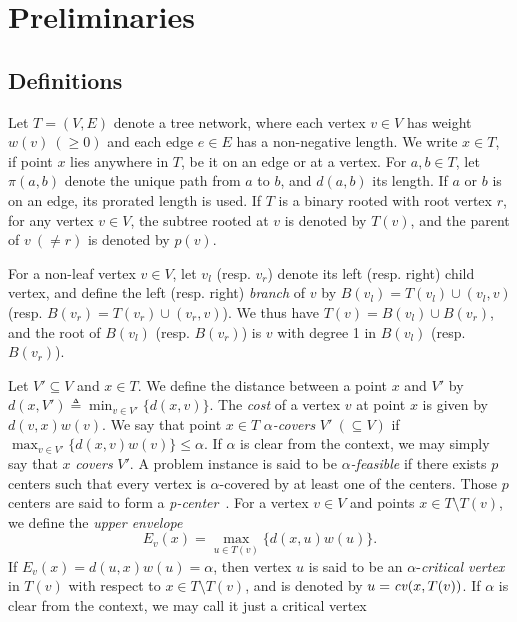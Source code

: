 \documentclass{llncs}
\begin{document}
{\section{Preliminaries}\label{sec:preliminary}

\subsection{Definitions}\label{sec:def}
Let $T\!=\!(V,E)$ denote a tree network,
where each vertex $v\in V$ has weight $w(v)~(\geq 0)$
and each edge $e\in E$ has a non-negative length.
We write $x\in T$, if point $x$ lies anywhere in $T$, be it on an edge or at a vertex.
For $a,b\in T$, 
let $\pi(a, b)$ denote the unique path from $a$ to $b$,
and $d(a, b)$ its length.
If $a$ or $b$ is on an edge,
its prorated length is used.
If $T$ is a binary rooted with root vertex $r$,
for any vertex $v\in V$, 
the subtree rooted at $v$ is denoted by $T(v)$,
and the parent of $v~(\not=r)$ is denoted by $p(v)$.

For a non-leaf vertex $v\in V$,
let $v_l$ (resp. $v_r$) denote its left (resp. right) child vertex,
and define the left (resp. right) {\em branch} of $v$ by
$B(v_l)=T(v_l) \cup (v_l,v)$ (resp. $B(v_r)=T(v_r) \cup (v_r,v)$).
We thus have $T(v) = B(v_l) \cup B(v_r)$,
and the root of $B(v_l)$ (resp. $B(v_r)$) is $v$ with degree 1
in $B(v_l)$ (resp. $B(v_r)$).

Let $V' \subseteq V$ and $x\in T$.
We define the distance between a point $x$ and $V'$ by
$
d(x,V') \triangleq \min_{v\in V'}\{d(x,v)\}.
$
The {\em cost} of a vertex $v$ at point $x$ is given by $d(v,x)w(v)$.
We say that point $x\in T$ {\em $\alpha$-covers} $V'~(\subseteq V)$
if $\max_{v\in V'}\{d(x,v)w(v)\} \leq \alpha$.
If $\alpha$ is clear from the context, we may simply say that $x$ {\em covers} $V'$.
A problem instance is said to be {\em $\alpha$-feasible} if there exists $p$ centers
such that every vertex is $\alpha$-covered by at least one of the centers.
Those $p$ centers are said to form a {\em p-center}~\cite{kariv1979b}. 
For a vertex $v\in V$ and points $x\in T\!\setminus\! T(v)$,
we define the {\em upper envelope}
\begin{equation}\label{eqn:uppEnv0}
E_v(x) = \max_{u\in T(v)}\{d(x,u)w(u)\}.
\end{equation}
If $E_v(x) =d(u,x)w(u)=\alpha$, 
then vertex $u$ is said to be an $\alpha$-{\em critical vertex} in $T(v)$ with respect to $x\in T\!\setminus\! T(v)$,
and is denoted by $u={\it cv}(x,T(v))$.  
If $\alpha$ is clear from the context,
we may call it just a critical vertex

}
\end{document}
